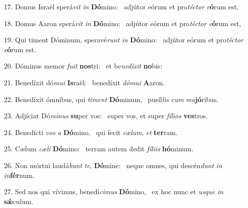 17. Domus Israël sperá\textit{vit} \textit{in} \textbf{Dó}mino: \ast\  adjútor eórum et pro\textit{téc}\textit{tor} \textit{e}\textbf{ó}rum est,\

18. Domus Aaron sperá\textit{vit} \textit{in} \textbf{Dó}mino: \ast\  adjútor eórum et pro\textit{téc}\textit{tor} \textit{e}\textbf{ó}rum est,\

19. Qui timent Dóminum, speravé\textit{runt} \textit{in} \textbf{Dó}mino: \ast\  adjútor eórum et pro\textit{téc}\textit{tor} \textit{e}\textbf{ó}rum est.\

20. Dóminus memor \textit{fu}\textit{it} \textbf{nos}tri: \ast\  et be\textit{ne}\textit{dí}\textit{xit} \textbf{no}bis:\

21. Benedíxit dó\textit{mu}\textit{i} \textbf{Is}raël: \ast\  benedíxit \textit{dó}\textit{mu}\textit{i} \textbf{A}aron.\

22. Benedíxit ómnibus, qui \textit{ti}\textit{ment} \textbf{Dó}minum, \ast\  pusíl\textit{lis} \textit{cum} \textit{ma}\textbf{jó}ribus.\

23. Adjíciat Dó\textit{mi}\textit{nus} \textbf{su}per vos: \ast\  super vos, et super \textit{fí}\textit{li}\textit{os} \textbf{ves}tros.\

24. Benedícti \textit{vos} \textit{a} \textbf{Dó}mino, \ast\  qui fecit \textit{cæ}\textit{lum}, \textit{et} \textbf{ter}ram.\

25. Cælum \textit{cæ}\textit{li} \textbf{Dó}mino: \ast\  terram autem dedit \textit{fí}\textit{li}\textit{is} \textbf{hó}minum.\

26. Non mórtui laudá\textit{bunt} \textit{te}, \textbf{Dó}mine: \ast\  neque omnes, qui descén\textit{dunt} \textit{in} \textit{in}\textbf{fér}num.\

27. Sed nos qui vívimus, benedí\textit{ci}\textit{mus} \textbf{Dó}mino, \ast\  ex hoc nunc et \textit{us}\textit{que} \textit{in} \textbf{sǽ}culum.\

